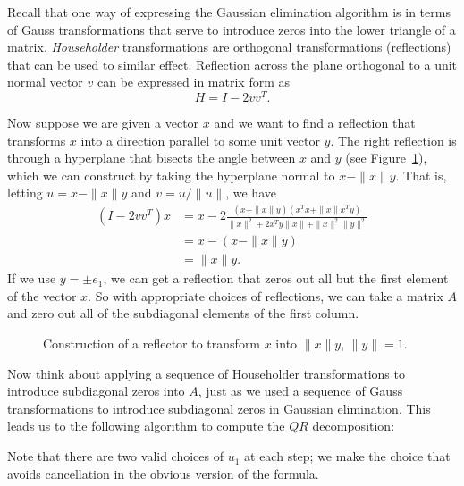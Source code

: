 \documentclass[12pt, leqno]{article}
\begin{document}
Recall that one way of expressing the Gaussian elimination algorithm
is in terms of Gauss transformations that serve to introduce zeros
into the lower triangle of a matrix.  {\em Householder} transformations
are orthogonal transformations (reflections) that can be used to similar
effect.  Reflection across the plane orthogonal to a unit normal 
vector $v$ can be expressed in matrix form as
\[
  H = I-2 vv^T.
\]

Now suppose we are given a vector $x$ and we want to find a reflection
that transforms $x$ into a direction parallel to some unit vector $y$.
The right reflection is through a hyperplane that bisects the angle
between $x$ and $y$ (see Figure~\ref{fig1}), which we can construct
by taking the hyperplane normal to $x-\|x\|y$.  That is,
letting $u = x - \|x\|y$ and $v = u/\|u\|$, we have
\begin{align*}
  (I-2vv^T)x 
  & = x - 2\frac{(x+\|x\|y)(x^T x + \|x\| x^T y)}{\|x\|^2 + 2 x^T y \|x\| + \|x\|^2 \|y\|^2} \\
  & = x - (x-\|x\|y) \\
  & = \|x\|y.
\end{align*}
If we use $y = \pm e_1$, we can get a reflection that zeros out all but the
first element of the vector $x$.  So with appropriate choices of reflections,
we can take a matrix $A$ and zero out all of the subdiagonal elements
of the first column.

\begin{figure}
\begin{center}
\end{center}
\caption{Construction of a reflector to transform $x$ into $\|x\|y$,
         $\|y\| = 1$.}
\label{fig1}
\end{figure}

Now think about applying a sequence of Householder transformations to
introduce subdiagonal zeros into $A$, just as we used a sequence of Gauss
transformations to introduce subdiagonal zeros in Gaussian elimination.
This leads us to the following algorithm to compute the $QR$
decomposition:

Note that there are two valid choices of $u_1$ at each step;
we make the choice that avoids cancellation in the obvious version
of the formula.
\end{document}
